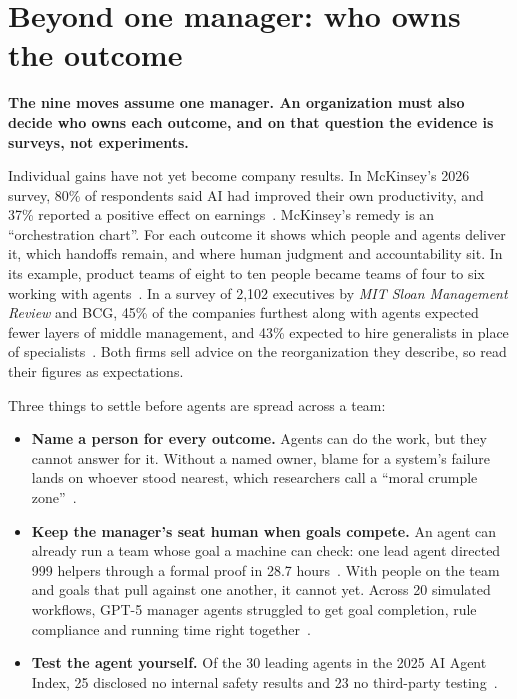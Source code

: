 \documentclass[11pt,letterpaper]{article}
\newcommand{\takeaway}[1]{\textbf{#1}}
\begin{document}
\section{Beyond one manager: who owns the outcome}\label{sec:org}

\takeaway{The nine moves assume one manager. An organization must also decide who owns each
outcome, and on that question the evidence is surveys, not experiments.}

Individual gains have not yet become company results. In McKinsey's 2026 survey, 80\% of
respondents said AI had improved their own productivity, and 37\% reported a positive effect
on earnings~\cite{mckinsey}. McKinsey's remedy is an ``orchestration chart''. For each
outcome it shows which people and agents deliver it, which handoffs remain, and where human
judgment and accountability sit. In its example, product teams of eight to ten people became
teams of four to six working with agents~\cite{mckinsey}. In a survey of 2,102 executives by
\emph{MIT Sloan Management Review} and BCG, 45\% of the companies furthest along with agents
expected fewer layers of middle management, and 43\% expected to hire generalists in place of
specialists~\cite{bcgmit}. Both firms sell advice on the reorganization they describe, so
read their figures as expectations.

Three things to settle before agents are spread across a team:

\begin{itemize}
  \item \textbf{Name a person for every outcome.} Agents can do the work, but they cannot
        answer for it. Without a named owner, blame for a system's failure lands on whoever
        stood nearest, which researchers call a ``moral crumple zone''~\cite{masters}.
  \item \textbf{Keep the manager's seat human when goals compete.} An agent can already run a
        team whose goal a machine can check: one lead agent directed 999 helpers through a
        formal proof in 28.7 hours~\cite{fermat}. With people on the team and goals that pull
        against one another, it cannot yet. Across 20 simulated workflows, GPT-5 manager
        agents struggled to get goal completion, rule compliance and running time right
        together~\cite{masters}.
  \item \textbf{Test the agent yourself.} Of the 30 leading agents in the 2025 AI Agent
        Index, 25 disclosed no internal safety results and 23 no third-party
        testing~\cite{agentindex}.
\end{itemize}
\end{document}
